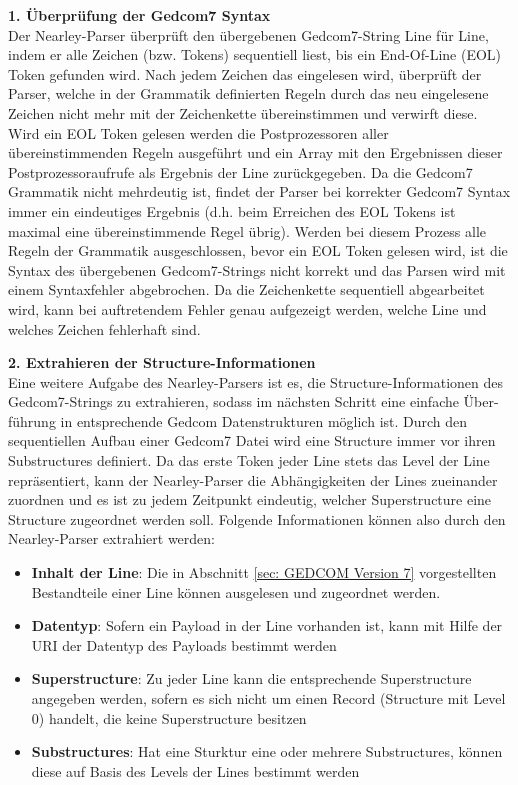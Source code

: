 \vspace{1em}
\textbf{1. Überprüfung der Gedcom7 Syntax} \vspace{0.35em} \\
Der Nearley-Parser überprüft den übergebenen Gedcom7-String Line für Line, indem er alle Zeichen (bzw. Tokens) sequentiell liest, bis ein End-Of-Line (EOL) Token  gefunden wird. Nach jedem Zeichen das eingelesen wird, überprüft der Parser, welche in der Grammatik definierten Regeln durch das neu eingelesene Zeichen nicht mehr mit der Zeichenkette übereinstimmen und verwirft diese. Wird ein EOL Token gelesen werden die Postprozessoren aller übereinstimmenden Regeln ausgeführt und ein Array mit den Ergebnissen dieser Postprozessoraufrufe als Ergebnis der Line zurückgegeben. Da die Gedcom7 Grammatik nicht mehrdeutig ist, findet der Parser bei korrekter Gedcom7 Syntax immer ein eindeutiges Ergebnis (d.h. beim Erreichen des EOL Tokens ist maximal eine übereinstimmende Regel übrig). Werden bei diesem Prozess alle Regeln der Grammatik ausgeschlossen, bevor ein EOL Token gelesen wird, ist die Syntax des übergebenen Gedcom7-Strings nicht korrekt und das Parsen wird mit einem Syntaxfehler abgebrochen. Da die Zeichenkette sequentiell abgearbeitet wird, kann bei auftretendem Fehler genau aufgezeigt werden, welche Line und welches Zeichen fehlerhaft sind.

\vspace{1em}
\textbf{2. Extrahieren der Structure-Informationen} \vspace{0.35em} \\
Eine weitere Aufgabe des Nearley-Parsers ist es, die Structure-Informationen des Gedcom7-Strings zu extrahieren, sodass im nächsten Schritt eine einfache Über-führung in entsprechende Gedcom Datenstrukturen möglich ist. Durch den sequentiellen Aufbau einer Gedcom7 Datei wird eine Structure immer vor ihren Substructures definiert. Da das erste Token jeder Line stets das Level der Line repräsentiert, kann der Nearley-Parser die Abhängigkeiten der Lines zueinander zuordnen und es ist zu jedem Zeitpunkt eindeutig, welcher Superstructure eine Structure zugeordnet werden soll. Folgende Informationen können also durch den Nearley-Parser extrahiert werden: 
\begin{itemize}
	\item \textbf{Inhalt der Line}: Die in Abschnitt \ref{sec: GEDCOM Version 7} vorgestellten Bestandteile einer Line können ausgelesen und zugeordnet werden.
	\item \textbf{Datentyp}: Sofern ein Payload in der Line vorhanden ist, kann mit Hilfe der URI der Datentyp des Payloads bestimmt werden
	\item \textbf{Superstructure}: Zu jeder Line kann die entsprechende Superstructure angegeben werden, sofern es sich nicht um einen Record (Structure mit Level 0) handelt, die keine Superstructure besitzen
	\item \textbf{Substructures}: Hat eine Sturktur eine oder mehrere Substructures, können diese auf Basis des Levels der Lines bestimmt werden
\end{itemize}

